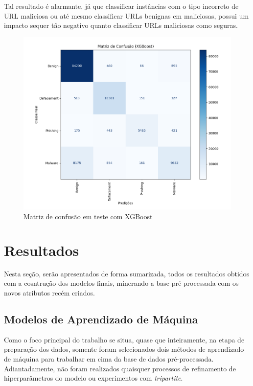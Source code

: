 \documentclass[a4paper, 12pt]{article}
\begin{document}
Tal resultado é alarmante, já que classificar instâncias com o tipo incorreto de URL maliciosa ou até mesmo classificar URLs benignas em maliciosas, possui um impacto sequer tão negativo quanto classificar URLs maliciosas como seguras.

\begin{figure}[H]
    \centering
    \includegraphics[width=1\textwidth]{Images/Figure_7.png}
    \caption{Matriz de confusão em teste com XGBoost}
    \label{fig:exampleFig7}
\end{figure}

\section{Resultados}

Nesta seção, serão apresentados de forma sumarizada, todos os resultados obtidos com a cosntrução dos modelos finais, minerando a base pré-processada com os novos atributos recém criados.

\subsection{Modelos de Aprendizado de Máquina}

Como o foco principal do trabalho se situa, quase que inteiramente, na etapa de preparação dos dados, somente foram selecionados dois métodos de aprendizado de máquina para trabalhar em cima da base de dados pré-processada. Adiantadamente, não foram realizados quaisquer processos de refinamento de hiperparâmetros do modelo ou experimentos com \emph{tripartite}.
\end{document}
